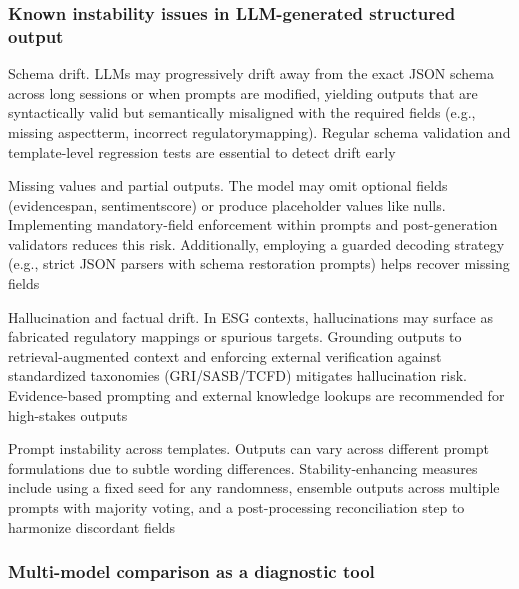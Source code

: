 \subsubsection{Known instability issues in LLM-generated structured output}

Schema drift. LLMs may progressively drift away from the exact JSON schema across long sessions or when prompts are modified, yielding outputs that are syntactically valid but semantically misaligned with the required fields (e.g., missing aspectterm, incorrect regulatorymapping). Regular schema validation and template-level regression tests are essential to detect drift early \cite{10.1037/t06541-000,10.18653/v1/2023.finnlp-2}

Missing values and partial outputs. The model may omit optional fields (evidencespan, sentimentscore) or produce placeholder values like nulls. Implementing mandatory-field enforcement within prompts and post-generation validators reduces this risk. Additionally, employing a guarded decoding strategy (e.g., strict JSON parsers with schema restoration prompts) helps recover missing fields \cite{10.18653/v1/2023.emnlp-demo.3,10.48550/arxiv.2511.14930}

Hallucination and factual drift. In ESG contexts, hallucinations may surface as fabricated regulatory mappings or spurious targets. Grounding outputs to retrieval-augmented context and enforcing external verification against standardized taxonomies (GRI/SASB/TCFD) mitigates hallucination risk. Evidence-based prompting and external knowledge lookups are recommended for high-stakes outputs \cite{10.4018/ijswis.385572,10.48550/arxiv.2511.14930,10.48550/arxiv.2511.01550}

Prompt instability across templates. Outputs can vary across different prompt formulations due to subtle wording differences. Stability-enhancing measures include using a fixed seed for any randomness, ensemble outputs across multiple prompts with majority voting, and a post-processing reconciliation step to harmonize discordant fields \cite{10.48550/arxiv.2510.04023,10.48550/arxiv.2511.14930}

\subsubsection{Multi-model comparison as a diagnostic tool}


